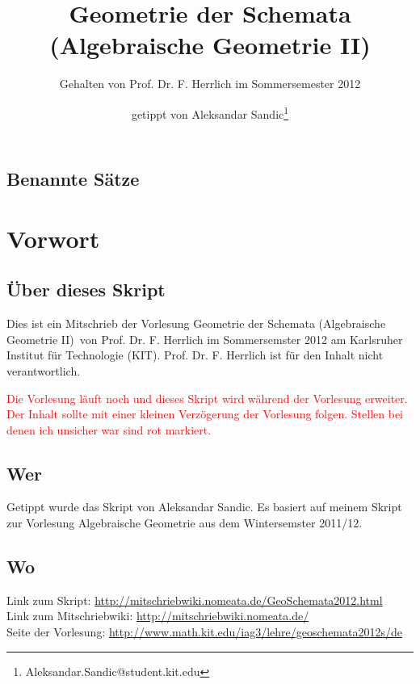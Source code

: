 \documentclass[a4paper, 12pt, numbers=noendperiod, chapterprefix=true]{scrbook}
\title{Geometrie der Schemata\\(Algebraische Geometrie II)}
\subtitle{Gehalten von Prof. Dr. F. Herrlich im Sommersemester 2012}
\author{getippt von Aleksandar Sandic\thanks{Aleksandar.Sandic@student.kit.edu}}
\theoremstyle{break}
\theoremstyle{nonumberbreak}
\theoremstyle{nonumberplain}
\begin{document}
\maketitle

\setlength\parskip{0.6pt}
\tableofcontents

\section*{Benannte S\"atze}


\setlength\parskip{\smallskipamount}



\chapter{Vorwort}
\setcounter{secnumdepth}{2}
\section*{\"Uber dieses Skript}
Dies ist ein Mitschrieb der Vorlesung \glqq Geometrie der Schemata (Algebraische Geometrie II)\grqq\ von Prof. Dr. F. Herrlich im Sommersemster 2012 am Karlsruher Institut f\"ur Technologie (KIT). Prof. Dr. F. Herrlich ist f\"ur  den Inhalt nicht verantwortlich.

\textcolor{red}{Die Vorlesung l\"auft noch und dieses Skript wird w\"ahrend der Vorlesung erweiter. Der Inhalt sollte mit einer kleinen Verz\"ogerung der Vorlesung folgen. Stellen bei denen ich unsicher war sind rot markiert.}
\section*{Wer}
Getippt wurde das Skript von Aleksandar Sandic. Es basiert auf meinem Skript zur Vorlesung Algebraische Geometrie aus dem Wintersemster 2011/12.

\section*{Wo}
Link zum Skript: \url{http://mitschriebwiki.nomeata.de/GeoSchemata2012.html}\\
Link zum Mitschriebwiki: \url{http://mitschriebwiki.nomeata.de/}\\
Seite der Vorlesung: \url{http://www.math.kit.edu/iag3/lehre/geoschemata2012s/de}
\end{document}
